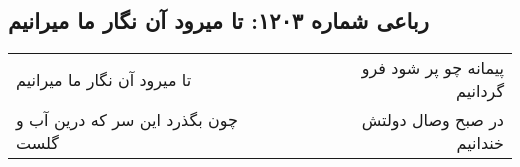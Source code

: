\begin{center}
\section*{رباعی شماره ۱۲۰۳: تا میرود آن نگار ما میرانیم}
\label{sec:1203}
\begin{longtable}{l p{0.5cm} r}
تا میرود آن نگار ما میرانیم
&&
پیمانه چو پر شود فرو گردانیم
\\
چون بگذرد این سر که درین آب و گلست
&&
در صبح وصال دولتش خندانیم
\\
\end{longtable}
\end{center}
